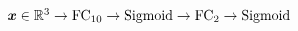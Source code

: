 $\vect{x} \in \real^3
	\newline \rightarrow \text{FC}_{10} \newline \rightarrow \text{Sigmoid}
	\newline \rightarrow \text{FC}_{2} \newline \rightarrow  \text{Sigmoid}$